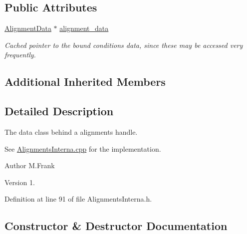 \subsection*{Public Attributes}
\begin{DoxyCompactItemize}
\item 
\hyperlink{class_d_d4hep_1_1_alignments_1_1_alignment_data}{Alignment\+Data} $\ast$ \hyperlink{class_d_d4hep_1_1_alignments_1_1_interna_1_1_alignment_condition_object_ac7ed3f9b51220db13f6d829198f3ea10}{alignment\+\_\+data}
\begin{DoxyCompactList}\small\item\em Cached pointer to the bound conditions data, since these may be accessed very frequently. \end{DoxyCompactList}\end{DoxyCompactItemize}
\subsection*{Additional Inherited Members}


\subsection{Detailed Description}
The data class behind a alignments handle. 

See \hyperlink{_alignments_interna_8cpp}{Alignments\+Interna.\+cpp} for the implementation.

\begin{DoxyAuthor}{Author}
M.\+Frank 
\end{DoxyAuthor}
\begin{DoxyVersion}{Version}
1. 
\end{DoxyVersion}


Definition at line 91 of file Alignments\+Interna.\+h.



\subsection{Constructor \& Destructor Documentation}
\hypertarget{class_d_d4hep_1_1_alignments_1_1_interna_1_1_alignment_condition_object_a7ce9315ac6a45cf8de0bc38f0c8d0e9d}{}\label{class_d_d4hep_1_1_alignments_1_1_interna_1_1_alignment_condition_object_a7ce9315ac6a45cf8de0bc38f0c8d0e9d} 
